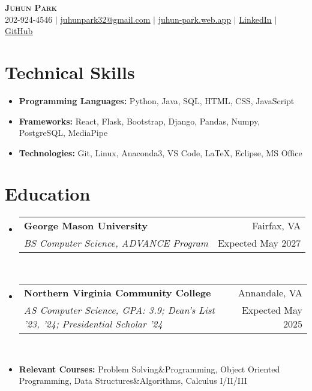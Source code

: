 \documentclass[letterpaper,11pt]{article}
\makeatletter
\newcommand{\resumeItem}[1]{
  \item\small{
    {#1 \vspace{-3pt}}
  }
}
\newcommand{\resumeItemThin}[1]{
  \item\small{
    {#1 \vspace{-7pt}}
  }
}
\newcommand{\resumeSubheading}[4]{
    \item
    \begin{tabular*}{0.97\textwidth}[t]{l@{\extracolsep{\fill}}r@{\hspace{-0.2in}}}
        \small{\textbf{#1}} & \small{#2} \\
        \textit{\small#3} & \small #4 \\
    \end{tabular*}\vspace{-5pt}
}
\newcommand{\resumeSubHeadingListStart}{\begin{itemize}[leftmargin=0.00in, rightmargin=-0.2in, label={}]}
\newcommand{\resumeSubHeadingListEnd}{\end{itemize}\vspace{-7pt}}
\newcommand{\resumeItemListStart}{\begin{itemize}[leftmargin=0.15in, rightmargin=0.15in]}
\newcommand{\resumeItemListEnd}{\end{itemize}\vspace{-7pt}}
\makeatother
\begin{document}

\begin{center}
  \textbf{\Huge \scshape {Juhun Park}} \\ \vspace{1pt}
  \small 202-924-4546 $|$
  \href{mailto:riann3207@gmail.com}{\underline{juhunpark32@gmail.com}} $|$
  \href{https://juhun-park.web.app/}{\underline{juhun-park.web.app}} $|$
  \href{https://linkedin.com/in/juhun-park}{\underline{LinkedIn}} $|$
  \href{https://github.com/juhun32}{\underline{GitHub}} \\
\end{center}

\vspace{-7pt}


\section{Technical Skills}
\vspace{3pt}
\resumeItemListStart
\resumeItemThin{\textbf{Programming Languages: } {Python, Java, SQL, HTML, CSS, JavaScript}}\\
\resumeItemThin{\textbf{Frameworks: }{React, Flask, Bootstrap, Django, Pandas, Numpy, PostgreSQL, MediaPipe}}\\
\resumeItemThin{\textbf{Technologies: } {Git, Linux, Anaconda3, VS Code, LaTeX, Eclipse, MS Office}}\\
\resumeItemListEnd
\vspace{3pt}


\section{Education}
\resumeSubHeadingListStart
\resumeSubheading
{George Mason University}{Fairfax, VA}
{BS Computer Science, ADVANCE Program}{Expected May 2027}\\

\resumeSubheading
{Northern Virginia Community College}{Annandale, VA}
{AS Computer Science, GPA: 3.9; Dean's List '23, '24; Presidential Scholar '24}{Expected May 2025} \\

\resumeItem{\textbf{Relevant Courses: }{Problem Solving\&Programming, Object Oriented Programming, Data Structures\&Algorithms, Calculus I/II/III}}
\resumeSubHeadingListEnd
\end{document}
